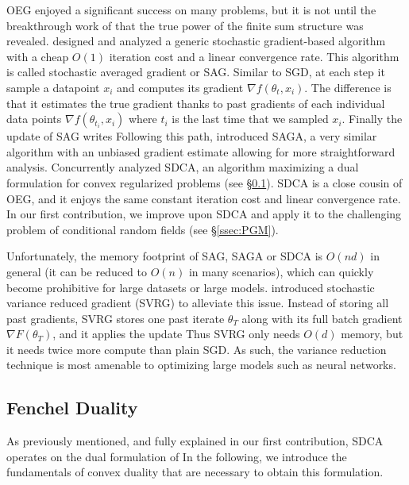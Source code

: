 OEG enjoyed a significant success on many problems, but it is not until the breakthrough work of \citet{roux2012stochastic} that the true power of the finite sum structure was revealed.
\citet{roux2012stochastic} designed and analyzed a generic  stochastic gradient-based algorithm with a  cheap $O(1)$ iteration cost and a linear convergence rate.
This algorithm is called stochastic averaged gradient or SAG.
Similar to SGD, at each step it sample a datapoint $x_i$ and computes its gradient $\nabla f(\theta_{t}, x_i)$.
The difference is that it estimates the true gradient thanks to past gradients of each individual data points $\nabla f(\theta_{t_i}, x_i)$ where $t_i$ is the last time that we sampled $x_i$.
Finally the update of SAG writes
Following this path, \citet{defazio2014saga} introduced SAGA, a very similar algorithm with an unbiased gradient estimate allowing for more straightforward analysis.
Concurrently \citet{shalev-shwartz_stochastic_2013} analyzed SDCA, an algorithm maximizing a dual formulation for convex regularized problems (see \S\ref{ssec:fenchel-duality}).
SDCA  is a close cousin of OEG, and it enjoys the same constant iteration cost and linear convergence rate.
In our first contribution, we improve upon SDCA and apply it to the challenging problem of conditional random fields (see \S\ref{ssec:PGM}).

Unfortunately, the memory footprint of SAG, SAGA or SDCA is $O(n d)$ in general (it can be reduced to $O(n)$ in many scenarios), which can quickly become prohibitive for large datasets or large models.
\citet{johnson2013accelerating} introduced stochastic variance reduced gradient (SVRG) to alleviate this issue.
Instead of storing all past gradients, SVRG stores one past iterate $\theta_T$ along with its full batch gradient $\nabla F(\theta_T)$, and it applies the update
Thus SVRG only needs $O(d)$ memory, but it needs twice more compute than plain SGD. As such, the variance reduction technique is most amenable to optimizing large models such as neural networks.

\subsection{Fenchel Duality}
\label{ssec:fenchel-duality}
As previously mentioned, and fully explained in our first contribution, SDCA operates on the dual formulation of
In the following, we introduce the fundamentals of convex duality that are necessary to obtain this formulation. 

